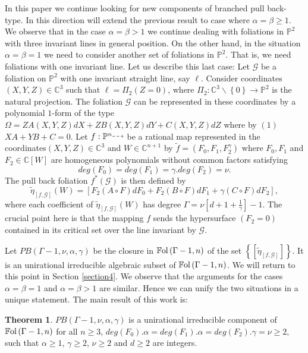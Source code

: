 \documentclass{amsart}
\theoremstyle{definition}
\theoremstyle{proposition}
\numberwithin{equation}{section}
\theoremstyle{main}
\newtheorem{main}{Theorem}
\begin{document}
In this paper we continue looking for new components of branched pull back-type. In this direction  will extend the previous result to case where $\alpha=\beta\geq1$. We observe that in the case 
$\alpha=\beta>1$ we continue dealing with foliations in $\mathbb P^2$ with three invariant lines in general position. On the other hand, in the situation $\alpha=\beta=1$ we need to consider another set of foliations in $\mathbb P^2$. That is, we need foliations with one invariant line. Let us describe this last case: Let $\mathcal G$ be a foliation on $\mathbb P^2$ with one invariant straight line, say $\ell$. Consider coordinates $(X,Y,Z)\in \mathbb C^3$ such that  $\ell=\Pi_2(Z=0)$, where $\Pi_{2}:\mathbb C^{3}\backslash \left\{0\right\} \to \mathbb P^{2}$ is the natural projection. The foliation $\mathcal G$ can be represented in these coordinates by a polynomial $1$-form of the type  $ \Omega= ZA\left(X,Y,Z\right)dX+ZB\left(X,Y,Z\right)dY+C\left(X,Y,Z\right)dZ$ where by $(1)$ $XA+YB+C=0$. Let  $f: {\mathbb P^n}  {\mathbin{\tikz [baseline=-0.25ex,-latex, dashed,->,densely dashed    ] \draw [->,densely dashed    ] (0pt,
0.5ex) -- (1.3em,0.5ex);}}$ be a rational map represented in the coordinates\break $(X,Y,Z)\in \mathbb{C}^3$ and $W \in \mathbb C^{n+1}$ by $\tilde f=(F_{0},F_{1},F^{\gamma}_{2})$ where $F_{0},F_{1}$ and $F_{2} \in \mathbb C[W]$ are homogeneous polynomials without common factors satisfying $$deg(F_{0})=deg(F_{1})=\gamma.deg(F_{2})=\nu.$$
The pull back foliation $f^{*}(\mathcal G)$ is then defined by 
$$\tilde\eta_{[f,\mathcal G]}\left(W\right)=\left[F_{2}\left(A\circ F\right) dF_{0} + F_{2}\left(B\circ F\right) dF_{1} + {\gamma}\left(C\circ F\right) dF_{2}\right],$$
where each coefficient of  $\tilde\eta_{[f,\mathcal G]}\left(W\right)$ has degree $\Gamma=\nu\left[d+1+\frac{1}{\gamma}\right] - 1.$ The crucial point here is that the mapping $f$ sends the  hypersurface $(F_{2}=0)$ contained in its critical set over the line invariant by $\mathcal G$.

Let $PB\left(\Gamma-1,\nu,\alpha,\gamma\right)$ be the closure in $\mathbb{F}{\rm{ol}}\left(\Gamma-1,n\right)$ of the set $\left\{ \left[\tilde\eta_{[f,\mathcal G]} \right] \right\}$. It is an unirational irreducible algebraic subset of $\mathbb{F}{\rm{ol}}\left(\Gamma-1,n\right)$. We will return to this point in Section \ref{section4}.
We observe that the arguments for the cases $\alpha=\beta=1$ and $\alpha=\beta>1$ are similar. Hence we can unify the two situations in a unique statement. The main result of this work is:
\begin{main}\label{teob}$PB(\Gamma-1,\nu,\alpha,\gamma)$ is a unirational irreducible component of \break $\mathbb{F}{\rm{ol}}\left(\Gamma-1,n\right)$ for all $n \geq 3$, $ deg(F_{0}).\alpha = deg(F_{1}).\alpha =deg(F_{2}).\gamma=\nu\geq2$, such that $\alpha \geq1 $, $\gamma\geq2$, $\nu\geq2$ and $d \geq 2$ are integers. 
 \end{main}
\end{document}
